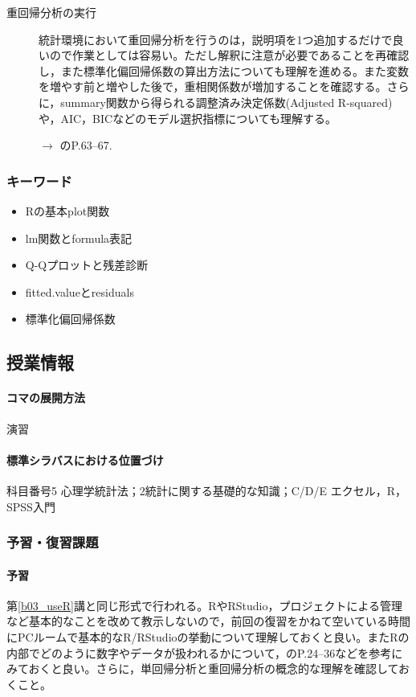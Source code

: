 \begin{description}
	\item[重回帰分析の実行] 統計環境において重回帰分析を行うのは，説明項を1つ追加するだけで良いので作業としては容易い。ただし解釈に注意が必要であることを再確認し，また標準化偏回帰係数の算出方法についても理解を進める。また変数を増やす前と増やした後で，重相関係数が増加することを確認する。さらに，summary関数から得られる調整済み決定係数(Adjusted R-squared)や，AIC，BICなどのモデル選択指標についても理解する。
	      \begin{flushright}
		      $\to$ \textcite{kosugi2018}のP.63--67.
	      \end{flushright}

\end{description}
\subsubsection{キーワード}
\begin{itemize}
	\item Rの基本plot関数
	\item lm関数とformula表記
	\item Q-Qプロットと残差診断
	\item fitted.valueとresiduals
	\item 標準化偏回帰係数
\end{itemize}
\subsection{授業情報}
\paragraph{コマの展開方法}
演習
\paragraph{標準シラバスにおける位置づけ}
科目番号5 心理学統計法；2統計に関する基礎的な知識；C/D/E エクセル，R，SPSS入門
\subsubsection{予習・復習課題}
\paragraph{予習}
第\ref{b03_useR}講と同じ形式で行われる。RやRStudio，プロジェクトによる管理など基本的なことを改めて教示しないので，前回の復習をかねて空いている時間にPCルームで基本的なR/RStudioの挙動について理解しておくと良い。またRの内部でどのように数字やデータが扱われるかについて，\textcite{kosugi2019}のP.24--36などを参考にみておくと良い。さらに，単回帰分析と重回帰分析の概念的な理解を確認しておくこと。
